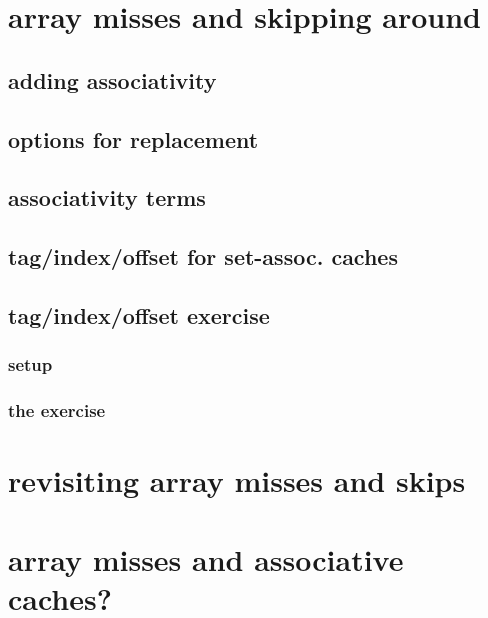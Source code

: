 \section{array misses and skipping around}


\subsection{adding associativity}



\subsection{options for replacement}



\subsection{associativity terms}


\subsection{tag/index/offset for set-assoc. caches}


\subsection{tag/index/offset exercise}
\subsubsection{setup}

\subsubsection{the exercise}


\section{revisiting array misses and skips}
\section{array misses and associative caches?}

